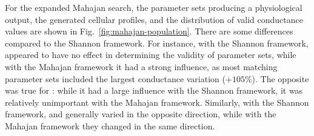 \documentclass[../thesis-main.tex]{subfiles}
\begin{document}
For the expanded Mahajan search, the parameter sets producing a physiological output, the generated cellular profiles, and the distribution of valid conductance values are shown in Fig.~\ref{fig:mahajan-population}. There are some differences compared to the Shannon framework. For instance, with the Shannon framework, \gks{} appeared to have no effect in determining the validity of parameter sets, while with the Mahajan framework it had a strong influence, as most matching parameter sets included the largest conductance variation ($+105\%$). The opposite was true for \gkix{}: while it had a large influence with the Shannon framework, it was relatively unimportant with the Mahajan framework. Similarly, with the Shannon framework, \gto{} and \gnak{} generally varied in the opposite direction, while with the Mahajan framework they changed in the same direction.
\end{document}
